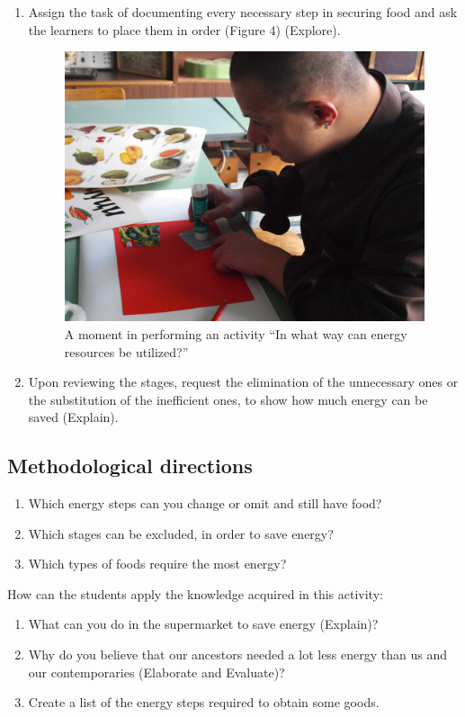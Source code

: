 \documentclass[11.5pt]{sig-alternate} %
\begin{document}
\begin{large}
\begin{enumerate}
    \item Assign the task of documenting every necessary step in securing food and ask the learners to place them in order (Figure 4) (Explore).
 
 \begin{figure}[h]
     \centering
     \includegraphics[width=0.9\linewidth]{images/fig4.jpg}
     \caption{A moment in performing an activity “In what way can energy resources be utilized?”}
 \end{figure}
 
    \item Upon reviewing the stages, request the elimination of the unnecessary ones or the substitution of the inefficient ones, to show how much energy can be saved (Explain).
\end{enumerate}

\subsection*{Methodological directions}

\begin{enumerate}
    \item Which energy steps can you change or omit and still have food?
    \item Which stages can be excluded, in order to save energy?
    \item Which types of foods require the most energy?
\end{enumerate}

How can the students apply the knowledge acquired in this activity:

\begin{enumerate}
    \item What can you do in the supermarket to save energy (Explain)?
    \item Why do you believe that our ancestors needed a lot less energy than us and our contemporaries (Elaborate and Evaluate)?
    \item Create a list of the energy steps required to obtain some goods.
\end{enumerate}


\end{large}
\end{document}
